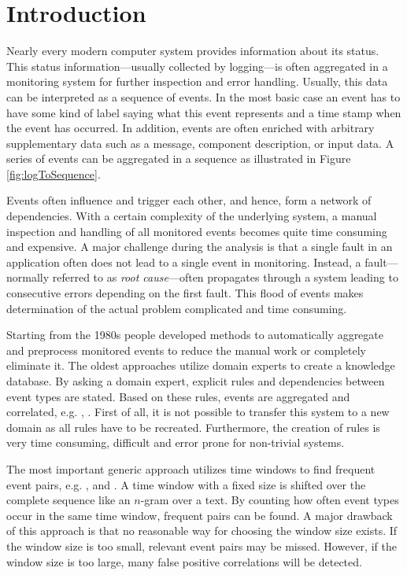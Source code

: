 \documentclass[conference]{IEEEtran}
\theoremstyle{examplestyle}
\begin{document}
\section{Introduction}
Nearly every modern computer system provides information about its status. This status information---usually collected by logging---is often aggregated in a monitoring system for further inspection and error handling. Usually, this data can be interpreted as a sequence of events. In the most basic case an event has to have some kind of label saying what this event represents and a time stamp when the event has occurred. In addition, events are often enriched with arbitrary supplementary data such as a message, component description, or input data. A series of events can be aggregated in a sequence as illustrated in Figure \ref{fig:logToSequence}.

Events often influence and trigger each other, and hence, form a network of dependencies. With a certain complexity of the underlying system, a manual inspection and handling of all monitored events becomes quite time consuming and expensive. A major challenge during the analysis is that a single fault in an application often does not lead to a single event in monitoring. Instead, a fault---normally referred to as \textit{root cause}---often propagates through a system leading to consecutive errors depending on the first fault. This flood of events makes determination of the actual problem complicated and time consuming.

Starting from the 1980s people developed methods to automatically aggregate and preprocess monitored events to reduce the manual work or completely eliminate it. The oldest approaches utilize domain experts to create a knowledge database. By asking a domain expert, explicit rules and dependencies between event types are stated. Based on these rules, events are aggregated and correlated, e.g. \cite{Houck1995}, \cite{Kettschau2002}. First of all, it is not possible to transfer this system to a new domain as all rules have to be recreated. Furthermore, the creation of rules is very time consuming, difficult and error prone for non-trivial systems.

The most important generic approach utilizes time windows to find frequent event pairs, e.g. \cite{Jakobson1993}, \cite{Mannila1997} and \cite{Bouandas2007}. A time window with a fixed size is shifted over the complete sequence like an \(n\)-gram over a text. By counting how often event types occur in the same time window, frequent pairs can be found. A major drawback of this approach is that no reasonable way for choosing the window size exists. If the window size is too small, relevant event pairs may be missed. However, if the window size is too large, many false positive correlations will be detected.
\end{document}
